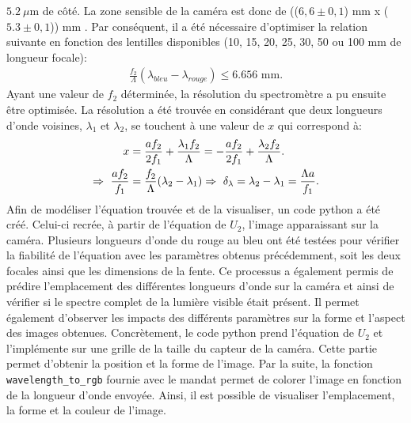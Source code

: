 \documentclass[conference]{IEEEtran}
\begin{document}
$5.2\ \mu$m de côté. La zone sensible de la caméra est donc de (($6,6\pm0,1$) mm x ($5.3\pm0,1$)) mm \cite{camera}. Par conséquent, il a été nécessaire d'optimiser la relation suivante
en fonction des lentilles disponibles (10, 15, 20, 25, 30, 50 ou 100 mm de longueur focale):
\begin{align}\label{spectre}
    \frac{f_2}{\Lambda}(\lambda_{bleu}-\lambda_{rouge})\leq 6.656\text{ mm}.
\end{align}
Ayant une valeur de $f_2$ déterminée, la résolution du spectromètre a pu ensuite être optimisée. La résolution a été trouvée en
considérant que deux longueurs d'onde voisines, $\lambda_1$ et $\lambda_2$, se touchent à une valeur de $x$ qui correspond à:
\begin{align}\label{resolution}
    x&=\frac{a f_2}{2f_1}+\frac{\lambda_1 f_2}{\Lambda}=-\frac{a f_2}{2f_1}+\frac{\lambda_2 f_2}{\Lambda}.\notag \\
    \Rightarrow\ \frac{af_2}{f_1}&=\frac{f_2}{\Lambda}(\lambda_2-\lambda_1)\Rightarrow\ \delta_{\lambda}=\lambda_2-\lambda_1=\frac{\Lambda a}{f_1}.
\end{align}
Afin de modéliser l'équation trouvée et de la visualiser, un code python a été créé. Celui-ci recrée, à partir de l'équation
de $U_2$, l'image apparaissant sur la caméra. Plusieurs longueurs d'onde du rouge au bleu ont été testées pour vérifier 
la fiabilité de l'équation avec les paramètres obtenus précédemment, soit les deux focales ainsi que les dimensions de la fente. 
Ce processus a également permis de prédire l'emplacement des différentes longueurs d'onde sur la caméra 
et ainsi de vérifier si le spectre complet de la lumière visible était présent. Il permet également d'observer les
impacts des différents paramètres sur la forme et l'aspect des images obtenues. Concrètement, le code python prend 
l'équation de $U_2$ et l'implémente sur une grille de la taille du capteur de la caméra. Cette partie permet d'obtenir 
la position et la forme de l'image. Par la suite, la fonction \texttt{wavelength\_to\_rgb} fournie avec le mandat permet de colorer l'image en fonction
de la longueur d'onde envoyée. Ainsi, il est possible de visualiser l'emplacement, la forme et la couleur de l'image.    
\end{document}
